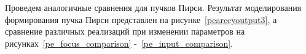 {%
%
%
%
%

    Проведем аналогичные сравнения для пучков Пирси. Результат моделирования формирования пучка Пирси представлен на рисунке~\ref{pearceyoutput3},
    а сравнение различных реализаций при изменении параметров на рисунках~\ref{pe_focus_comparison} -~\ref{pe_input_comparison}.

}
